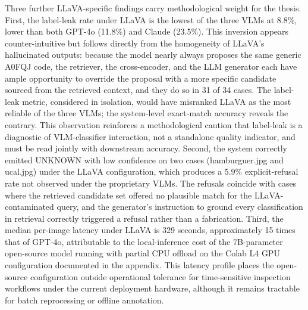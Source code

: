 Three further LLaVA-specific findings carry methodological weight for the thesis. First, the label-leak rate under LLaVA is the lowest of the three VLMs at 8.8\%, lower than both GPT-4o (11.8\%) and Claude (23.5\%). This inversion appears counter-intuitive but follows directly from the homogeneity of LLaVA's hallucinated outputs: because the model nearly always proposes the same generic A0FQJ code, the retriever, the cross-encoder, and the LLM generator each have ample opportunity to override the proposal with a more specific candidate sourced from the retrieved context, and they do so in 31 of 34 cases. The label-leak metric, considered in isolation, would have misranked LLaVA as the most reliable of the three VLMs; the system-level exact-match accuracy reveals the contrary. This observation reinforces a methodological caution that label-leak is a diagnostic of VLM-classifier interaction, not a standalone quality indicator, and must be read jointly with downstream accuracy. Second, the system correctly emitted UNKNOWN with low confidence on two cases (hamburguer.jpg and ucal.jpg) under the LLaVA configuration, which produces a 5.9\% explicit-refusal rate not observed under the proprietary VLMs. The refusals coincide with cases where the retrieved candidate set offered no plausible match for the LLaVA-contaminated query, and the generator's instruction to ground every classification in retrieval correctly triggered a refusal rather than a fabrication. Third, the median per-image latency under LLaVA is 329 seconds, approximately 15 times that of GPT-4o, attributable to the local-inference cost of the 7B-parameter open-source model running with partial CPU offload on the Colab L4 GPU configuration documented in the appendix. This latency profile places the open-source configuration outside operational tolerance for time-sensitive inspection workflows under the current deployment hardware, although it remains tractable for batch reprocessing or offline annotation.

